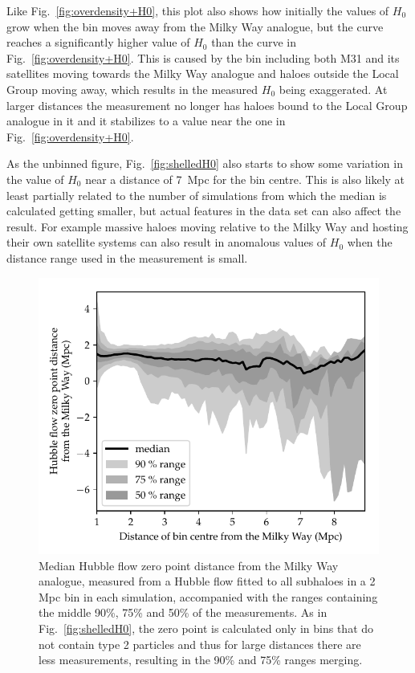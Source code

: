 \documentclass[english, oneside]{HYgradu}
\begin{document}
Like Fig.~\ref{fig:overdensity+H0}, this plot also shows how initially the values of $H_0$ grow when the bin moves away from the Milky Way analogue, but the curve reaches a significantly higher value of $H_0$ than the curve in Fig.~\ref{fig:overdensity+H0}. This is caused by the bin including both M31 and its satellites moving towards the Milky Way analogue and haloes outside the Local Group moving away, which results in the measured $H_0$ being exaggerated. At larger distances the measurement no longer has haloes bound to the Local Group analogue in it and it stabilizes to a value near the one in Fig.~\ref{fig:overdensity+H0}.

As the unbinned figure, Fig.~\ref{fig:shelledH0} also starts to show some variation in the value of $H_0$ near a distance of 7~Mpc for the bin centre. This is also likely at least partially related to the number of simulations from which the median is calculated getting smaller, but actual features in the data set can also affect the result. For example massive haloes moving relative to the Milky Way and hosting their own satellite systems can also result in anomalous values of $H_0$ when the distance range used in the measurement is small.

\begin{figure}
    \centering
    \includegraphics{kuvat/zeros.pdf}
    \caption{Median Hubble flow zero point distance from the Milky Way analogue, measured from a Hubble flow fitted to all subhaloes in a 2 Mpc bin in each simulation, accompanied with the ranges containing the middle 90\%, 75\% and 50\% of the measurements. As in Fig.~\ref{fig:shelledH0}, the zero point is calculated only in bins that do not contain type 2 particles and thus for large distances there are less measurements, resulting in the 90\% and 75\% ranges merging.}\label{fig:shelledZeros}
\end{figure}
\end{document}
